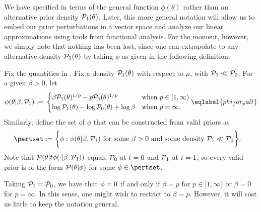 We have specified  in terms of the general function
$\phi(\theta)$ rather than an alternative prior density $\mathcal{P}_{1}(\theta)$. Later,
this more general notation will allow us to embed our prior perturbations in a
vector space and analyze our linear approximations using tools from functional
analysis.  For the moment, however, we simply note that nothing has been lost,
since one can extrapolate to any alternative density $\mathcal{P}_{1}(\theta)$ by taking
$\phi$ as given in the following definition.


\begin{defn}
%
Fix the quantities in .  Fix a density $\mathcal{P}_{1}(\theta)$
with respect to $\mu$, with $\mathcal{P}_{1} \ll \mathcal{P}_{0}$. For a given $\beta > 0$, let
%
\begin{align}
%
\phi(\theta | \beta, \palt) :={}
\begin{cases}
\beta \palt(\theta)^{1/p} - p \pbase(\theta)^{1/p}
    & \textrm{when }p \in [1, \infty) \\
\log \palt(\theta) - \log \pbase(\theta) + \log \beta
    & \textrm{when }p = \infty.
\end{cases} \eqlabel{phi_for_palt}
%
\end{align}
%
Similarly, define the set of $\phi$ that can be constructed from
valid priors as
%
\begin{align*}
%
\pertset := \bigg\{&
    \phi:  \phi(\theta | \beta, \palt) %
    \textrm{ for some }\beta > 0\textrm{ and some density }\palt \ll \pbase
\bigg\}.
%
\end{align*}
%
Note that $\mathcal{P}(\theta \vert t \phi(\cdot \vert \beta, \mathcal{P}_{1}))$ equals $\mathcal{P}_{0}$
at $t = 0$ and $\mathcal{P}_{1}$ at $t = 1$, so every valid prior is of the form
$\mathcal{P}(\theta \vert \phi)$ for some $\phi \in \pertset$.
%
\end{defn}



\begin{ex}
%
Taking $\mathcal{P}_{1} = \mathcal{P}_{0}$, we have that $\phi = 0$ if and only if $\beta = p$
for $p \in [1, \infty)$ or $\beta = 0$ for $p = \infty$. In this sense, one
might wish to restrict to $\beta = p$.  However, it will cost us little to keep
the notation general.
%
\end{ex}

